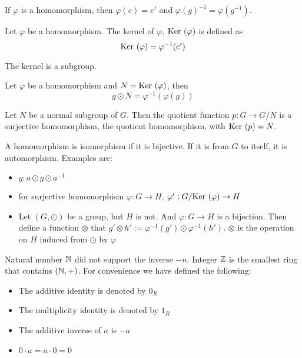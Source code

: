 \begin{theorem}
    If $\varphi$ is a homomorphism, then $\varphi(e) = e'$ and $\varphi(g)^{-1} = \varphi(g^{-1})$.
\end{theorem}

\begin{definition}[kernel]
    Let $\varphi$ be a homomorphism. The kernel of $\varphi$, $\displaystyle \mathrm{Ker}~( \varphi )$ is defined as
    \begin{equation}
        \displaystyle \mathrm{Ker}~( \varphi ) = \varphi^{-1}(e')
    \end{equation}
    
    The kernel is a subgroup.
\end{definition}

\begin{theorem}
Let $\varphi$ be a homomorphism and $N = \displaystyle \mathrm{Ker}~( \varphi )$, then
\begin{equation}
    g \odot N = \varphi^{-1}\left(\varphi(g)\right)
\end{equation}
\end{theorem}

\begin{theorem}
    Let $N$ be a normal subgroup of $G$. Then the quotient function $p: G \rightarrow G/N$ is a surjective homomorphism, the quotient homomorphism, with $\displaystyle \mathrm{Ker}~( p ) = N$.
\end{theorem}


\begin{definition}[isomorphism]
    A homomorphism is isomorphism if it is bijective. If it is from $G$ to itself, it is automorphism. Examples are:
    \begin{itemize}
        \item $g: a \odot g \odot a^{-1}$
        \item for surjective homomorphism $\varphi: G \rightarrow H$, $\varphi' : G/\displaystyle \mathrm{Ker}~( \varphi ) \rightarrow H$
        \item Let $(G, \odot)$ be a group, but $H$ is not. And $\varphi: G \rightarrow H$ is a bijection. Then define a function $\otimes$ that $g' \otimes h' := \varphi^{-1}(g') \odot \varphi^{-1}(h')$. $\otimes$ is the operation on $H$ induced from $\odot$ by $\varphi$
    \end{itemize}
\end{definition}


Natural number $\mathbb{N}$ did not support the inverse $-n$. Integer $\mathbb{Z}$ is the smallest ring that contains $(\mathbb{N}, +)$. For convenience we have defined the following:
\begin{itemize}
    \item The additive identity is denoted by $0_R$
    \item The multiplicity identity is denoted by $1_R$
    \item The additive inverse of $a$ is $-a$
    \item $0 \cdot a = a \cdot 0 = 0$
\end{itemize}

